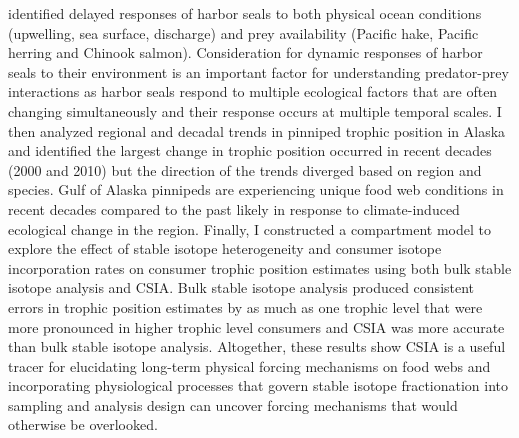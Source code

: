 \documentclass [11pt, proquest] {uwthesis}[2015/03/03]
\begin{document}
{identified delayed responses of harbor seals to both physical ocean
conditions (upwelling, sea surface, discharge) and prey availability
(Pacific hake, Pacific herring and Chinook salmon). Consideration for
dynamic responses of harbor seals to their environment is an important
factor for understanding predator-prey interactions as harbor seals
respond to multiple ecological factors that are often changing
simultaneously and their response occurs at multiple temporal scales. I
then analyzed regional and decadal trends in pinniped trophic position
in Alaska and identified the largest change in trophic position occurred
in recent decades (2000 and 2010) but the direction of the trends
diverged based on region and species. Gulf of Alaska pinnipeds are
experiencing unique food web conditions in recent decades compared to
the past likely in response to climate-induced ecological change in the
region. Finally, I constructed a compartment model to explore the effect
of stable isotope heterogeneity and consumer isotope incorporation rates
on consumer trophic position estimates using both bulk stable isotope
analysis and CSIA. Bulk stable isotope analysis produced consistent
errors in trophic position estimates by as much as one trophic level
that were more pronounced in higher trophic level consumers and CSIA was
more accurate than bulk stable isotope analysis. Altogether, these
results show CSIA is a useful tracer for elucidating long-term physical
forcing mechanisms on food webs and incorporating physiological
processes that govern stable isotope fractionation into sampling and
analysis design can uncover forcing mechanisms that would otherwise be
overlooked.}

\tableofcontents
\listoffigures
\listoftables
\end{document}
